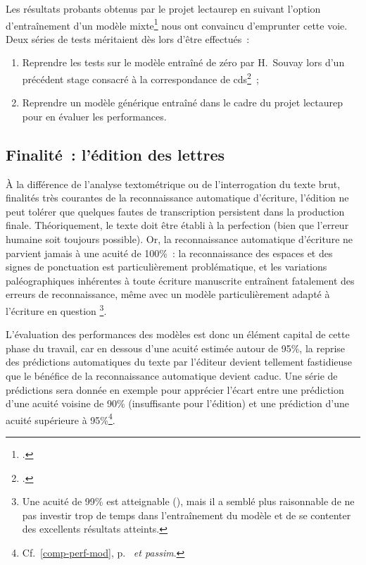\documentclass[a4paper,12pt,twoside]{book}
\begin{document}
				Les résultats probants obtenus par le projet \gls{lectaurep} en suivant l'option d'entraînement d'un modèle mixte\footcite{chagueCreationModelesTranscriptiona} nous ont convaincu d'emprunter cette voie. Deux séries de tests méritaient dès lors d'être effectués~:
		
				\begin{enumerate}
					\item Reprendre les tests sur le modèle entraîné de zéro par H.~Souvay lors d'un précédent stage consacré à la correspondance de \gls{cds}\footcite{souvayCorrespondanceConstanceSalm2021}~;
					\item Reprendre un modèle générique entraîné dans le cadre du projet \gls{lectaurep} pour en évaluer les performances.
				\end{enumerate}
		
			\subsection{Finalité~: l'édition des lettres}
				À la différence de l'analyse textométrique ou de l'interrogation du texte brut, finalités très courantes de la reconnaissance automatique d'écriture, l'édition ne peut tolérer que quelques fautes de transcription persistent dans la production finale. Théoriquement, le texte doit être établi à la perfection (bien que l'erreur humaine soit toujours possible). Or, la reconnaissance automatique d'écriture ne parvient jamais à une acuité de 100\%~: la reconnaissance des espaces et des signes de ponctuation est particulièrement problématique, et les variations paléographiques inhérentes à toute écriture manuscrite entraînent fatalement des erreurs de reconnaissance, même avec un modèle particulièrement adapté à l'écriture en question
				\footnote{
					Une acuité de 99\% est atteignable (\cite{stokesEScriptoriumVREManuscript2021}), mais il a semblé plus raisonnable de ne pas investir trop de temps dans l'entraînement du modèle et de se contenter des excellents résultats atteints.
					}.
				
				L'évaluation des performances des modèles est donc un élément capital de cette phase du travail, car en dessous d'une acuité estimée autour de 95\%, la reprise des \glspl{prédiction} automatiques du texte par l'éditeur devient tellement fastidieuse que le bénéfice de la reconnaissance automatique devient caduc. Une série de \glspl{prédiction} sera donnée en exemple pour apprécier l'écart entre une \gls{prédiction} d'une acuité voisine de 90\% (insuffisante pour l'édition) et une \gls{prédiction} d'une acuité supérieure à 95\%\footnote{Cf.~\ref{comp-perf-mod}, p.~\pageref{comp-perf-mod} \textit{et passim}.}.
				
\end{document}
